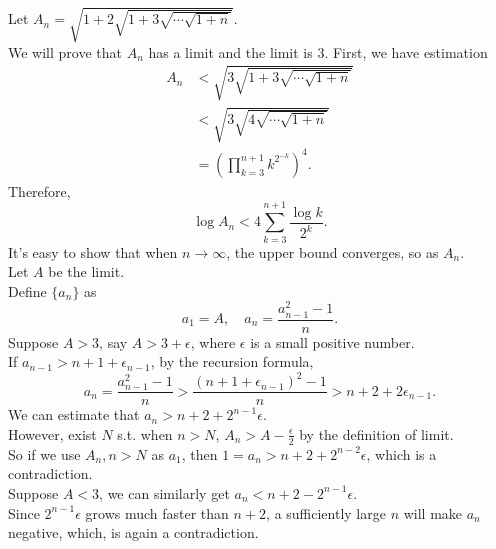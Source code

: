 \documentclass[UTF8,12pt]{article}
\begin{document}
	Let $A_n = \sqrt{1+2\sqrt{1+3\sqrt{\cdots\sqrt{1+n}}}}$.\\
	We will prove that $A_n$ has a limit and the limit is $3$.
	First, we have estimation
	\begin{equation}
		\begin{aligned}
			A_n&<\sqrt{3\sqrt{1+3\sqrt{\cdots\sqrt{1+n}}}}\\
			&<\sqrt{3\sqrt{4\sqrt{\cdots\sqrt{1+n}}}}\\
			&=(\prod_{k=3}^{n+1}k^{2^{-k}})^4.
		\end{aligned}
	\end{equation}
	Therefore, \[
		\log A_n < 4 \sum_{k=3}^{n+1}\frac{\log k}{2^k}
	.\]
	It's easy to show that when $n \to \infty$, the upper bound converges, so as $A_n$.\\
	Let $A$ be the limit.\\
	Define $\{a_n\}$ as \[
		a_1=A,\quad a_{n}=\frac{a_{n-1}^2-1}{n}
	.\]
	Suppose $A > 3$, say $A > 3+\epsilon$, where $\epsilon$ is a small positive number.\\
	If $a_{n-1} > n+1+\epsilon_{n-1}$, by the recursion formula, \[
		a_n=\frac{a_{n-1}^2-1}{n}>\frac{(n+1+\epsilon_{n-1})^2-1}{n}>n+2+2\epsilon_{n-1}
	.\]
	We can estimate that $a_n > n+2+2^{n-1}\epsilon$.\\
	However, exist $N$ s.t. when $n>N$, $A_n>A-\frac{\epsilon}{2}$ by the definition of limit.\\
	So if we use $A_n,n>N$ as $a_1$, then $1 = a_n > n+2+2^{n-2}\epsilon$, which is a contradiction.\\
	Suppose $A < 3$, we can similarly get $a_n < n+2-2^{n-1}\epsilon$.\\
	Since $2^{n-1}\epsilon$ grows much faster than $n+2$, a sufficiently large $n$ will make $a_n$ negative, 
	which, is again a contradiction.
\end{document}
